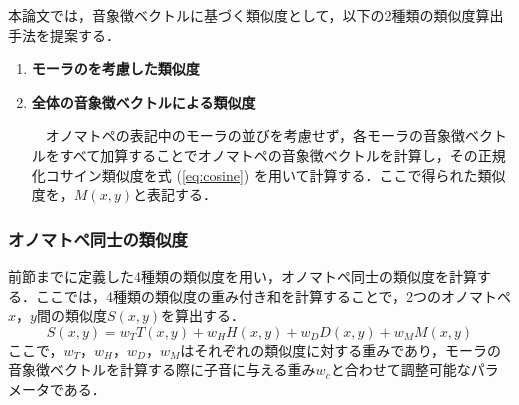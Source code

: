 \documentclass[japanese]{jnlp_1.4}
\newcommand{\addtext}[1]{}
\begin{document}
本論文では，音象徴ベクトルに基づく類似度として，以下の2種類の類似度算出手法を提案する．


\begin{enumerate}
\item \textbf{モーラの\addtext{並び順と長さ}を考慮した類似度}

\addtext{　オノマトペの表記中のモーラの並び順と長さを考慮するため，2つのオノマトペのモーラ系列間の類似度を動的計画法 (DP) を用いたDTW (Dynamic Time Warping) で計算する．DTWは2つのシンボル系列において，各シンボル間に定義された類似度をもとに，系列同士の類似度を求める方法である．2つのシンボル系列{$A=a_{1}a_{2}\cdots a_{I}$}と{$B=b_{1}b_{2}\cdots b_{J}$}（{$I, J$}は各系列の長さ）があった時，あらかじめ各シンボル間の類似度{$d(a_{i}, b_{j})$}を定義しておき，シンボルの順序を保存する（シンボル{$a_{i}$}が{$b_{j}$}と対応したとすると，{$a_{i+k}$} ({$k>0$})は必ず{$b_{j+m}$} ({$m\geq 0$}) と対応づけがなされる）という制約のもとで，対応するシンボル間の類似度の総和が最大になるような対応づけを求める．この時，{$a_{1}$}は{$b_{1}$}と，{$a_{I}$}は{$b_{J}$}と対応づけを行うこととする．最適な対応づけの探索は動的計画法を用いて効率よく計算され，結果として非線形に伸縮する系列間の類似度を計算することが可能となる．}

\addtext{　ここでは，各オノマトペをモーラの系列と捉え，2つのモーラ系列間の類似度をDTWで計算する．この時，各モーラ間の類似度は式 ({\ref{eq:cosine}}) で計算される正規化されたコサイン類似度を用いる．こうして得られた類似度の最大値を，{$D(x, y)$}と表記する．}


\item \textbf{全体の音象徴ベクトルによる類似度}

　オノマトペの表記中のモーラの並びを考慮せず，各モーラの音象徴ベクトルをすべて加算することでオノマトペの音象徴ベクトルを計算し，その正規化コサイン類似度を式 (\ref{eq:cosine}) を用いて計算する．ここで得られた類似度を，$M(x, y)$と表記する．

\end{enumerate}



\subsubsection{オノマトペ同士の類似度}

前節までに定義した4種類の類似度を用い，オノマトペ同士の類似度を計算する．ここでは，4種類の類似度の重み付き和を計算することで，2つのオノマトペ$x$，$y$間の類似度$S(x, y)$を算出する．
\begin{equation}
S(x, y) = w_{T}T(x, y) + w_{H}H(x, y) +w_{D}D(x, y) +w_{M}M(x, y)
\end{equation}
ここで，$w_{T}$，$w_{H}$，$w_{D}$，$w_{M}$はそれぞれの類似度に対する重みであり，モーラの音象徴ベクトルを計算する際に子音に与える重み$w_{c}$と合わせて調整可能なパラメータである．\addtext{各類似度はすべて，全く同じもの同士の時が1，全く異なるもの同士の時に0となるように正規化されている．しかし，各類似度がオノマトペの印象を推定する上でどの程度重要であるかはわからないため，各類似度の重要度を変化させるためのパラメータとして重みを用い，実験的に最適な値を探索することとする．}
\end{document}
